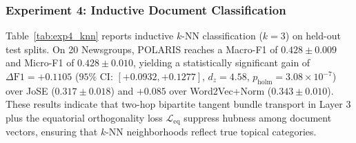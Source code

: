 \documentclass[journal]{IEEEtran}
\begin{document}
\begin{table}[!t]
\centering
\caption{Experiment 4: Inductive Non-Parametric $k$-NN Document Classification ($k=3$) on Held-Out Test Sets Across 10 Seeds (Mean $\pm$ SD).}
\label{tab:exp4_knn}
\end{table}

\subsubsection{Experiment 4: Inductive Document Classification}
Table~\ref{tab:exp4_knn} reports inductive $k$-NN classification ($k=3$) on held-out test splits. On 20 Newsgroups, POLARIS reaches a Macro-F1 of $\mathbf{0.428 \pm 0.009}$ and Micro-F1 of $\mathbf{0.428 \pm 0.010}$, yielding a statistically significant gain of $\Delta\text{F1} = +0.1105$ ($95\%$ CI: $[+0.0932, +0.1277]$, $d_z = 4.58$, $p_{\text{holm}} = 3.08 \times 10^{-7}$) over JoSE ($0.317 \pm 0.018$) and $+0.085$ over Word2Vec+Norm ($0.343 \pm 0.010$). These results indicate that two-hop bipartite tangent bundle transport in Layer 3 plus the equatorial orthogonality loss $\mathcal{L}_{\text{eq}}$ suppress hubness among document vectors, ensuring that $k$-NN neighborhoods reflect true topical categories.
\end{document}
